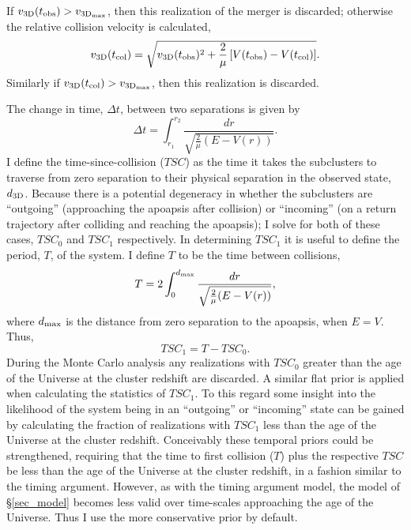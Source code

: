 \documentclass[12pt]{emulateapj}
\begin{document}
If $v_{\rm 3D}(t_{\rm obs}) > v_{\rm 3D_{max}}$, then this realization of the merger is discarded; otherwise the relative collision velocity is calculated,
\begin{equation}
v_{\rm 3D}(t_{\rm col}) = \sqrt{v_{\rm 3D}(t_{\rm obs})^2+\frac{2}{\mu}\left[V(t_{\rm obs})-V(t_{\rm col})\right]}.
\label{eq_v3Dcol}
\end{equation}
Similarly if $v_{\rm 3D}(t_{\rm col}) >v_{\rm 3D_{max}}$, then this realization is discarded.

The change in time, $\Delta t$, between two separations is given by
\begin{equation}
\Delta t = \int_{r_1}^{r_2} \frac{dr}{\sqrt{\frac{2}{\mu}(E-V(r))}}.
\label{eq_deltat}
\end{equation}
I define the time-since-collision ($TSC$) as the time it takes the subclusters to traverse from zero separation to their physical separation in the observed state, $d_{\rm 3D}$. 
Because there is a potential degeneracy in whether the subclusters are ``outgoing'' (approaching the apoapsis after collision)  or ``incoming'' (on a return trajectory after colliding and reaching the apoapsis); I solve for both of these cases, $TSC_0$ and $TSC_1$ respectively.
In determining $TSC_1$ it is useful to define the period, $T$, of the system.  I define $T$ to be the time between collisions,
\begin{displaymath}
T  = 2 \int_{0}^{d_{\rm max}} \frac{dr}{\sqrt{\frac{2}{\mu}(E-V(r))}},
\end{displaymath}
where $d_{\rm max}$ is the distance from zero separation to the apoapsis, when $E=V$.
Thus,
\begin{displaymath}
TSC_1 = T - TSC_0.
\end{displaymath}
During the Monte Carlo analysis any realizations with $TSC_0$ greater than the age of the Universe at the cluster redshift are discarded.
A similar flat prior is applied when calculating the statistics of $TSC_1$.
To this regard some insight into the likelihood of the system being in an ``outgoing'' or ``incoming'' state can be gained by calculating the fraction of realizations with $TSC_1$ less than the age of the Universe at the cluster redshift.
Conceivably these temporal priors could be strengthened, requiring that the time to first collision ($T$) plus the respective $TSC$ be less than the age of the Universe at the cluster redshift, in a fashion similar to the timing argument.
However, as with the timing argument model, the model of \S\ref{sec_model} becomes less valid over time-scales approaching the age of the Universe.
Thus I use the more conservative prior by default.
\end{document}
